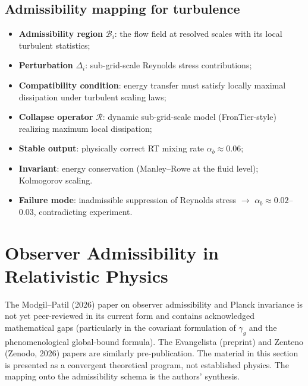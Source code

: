 \documentclass[12pt, a4paper]{article}
\theoremstyle{plain}
\theoremstyle{definition}
\theoremstyle{remark}
\newcommand{\Rcal}{\mathcal{R}}
\newcommand{\Bcal}{\mathcal{B}}
\begin{document}
\subsection{Admissibility mapping for turbulence}

\begin{itemize}
  \item \textbf{Admissibility region} $\Bcal_i$: the flow field at
        resolved scales with its local turbulent statistics;
  \item \textbf{Perturbation} $\Delta_i$: sub-grid-scale Reynolds
        stress contributions;
  \item \textbf{Compatibility condition}: energy transfer must satisfy
        locally maximal dissipation under turbulent scaling laws;
  \item \textbf{Collapse operator} $\Rcal$: dynamic sub-grid-scale
        model (FronTier-style) realizing maximum local dissipation;
  \item \textbf{Stable output}: physically correct RT mixing rate
        $\alpha_b \approx 0.06$;
  \item \textbf{Invariant}: energy conservation (Manley--Rowe at the
        fluid level); Kolmogorov scaling.
  \item \textbf{Failure mode}: inadmissible suppression of Reynolds
        stress $\to$ $\alpha_b \approx 0.02$--$0.03$, contradicting
        experiment.
\end{itemize}

\section{Observer Admissibility in Relativistic Physics}
\label{sec:relativity}

\begin{speculative}
  The Modgil--Patil (2026) paper on observer admissibility and Planck
  invariance is not yet peer-reviewed in its current form and contains
  acknowledged mathematical gaps (particularly in the covariant
  formulation of $\gamma_g$ and the phenomenological global-bound
  formula).
  The Evangelista (preprint) and Zenteno (Zenodo, 2026) papers are
  similarly pre-publication.
  The material in this section is presented as a convergent theoretical
  program, not established physics.
  The mapping onto the admissibility schema is the authors' synthesis.
\end{speculative}
\end{document}
